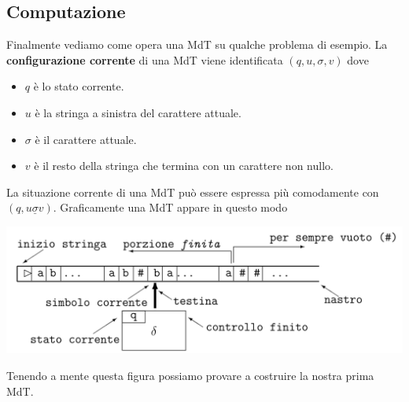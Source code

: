\subsection{Computazione}
Finalmente vediamo come opera una MdT su qualche problema di
esempio. La \textbf{configurazione corrente} di una MdT viene
identificata $(q, u, \sigma, v)$ dove
\begin{itemize}
	\item $q$ è lo stato corrente.
	\item $u$ è la stringa a sinistra del carattere attuale.
	\item $\sigma$ è il carattere attuale.
	\item $v$ è il resto della stringa che termina con un
	      carattere non nullo.
\end{itemize}
La situazione corrente di una MdT può essere espressa più
comodamente con $(q, u \underline{\sigma} v)$. Graficamente
una MdT appare in questo modo
\begin{center}
	\includegraphics[scale=0.225]{images/turing.png}
\end{center}
Tenendo a mente questa figura possiamo provare a costruire la
nostra prima MdT.

